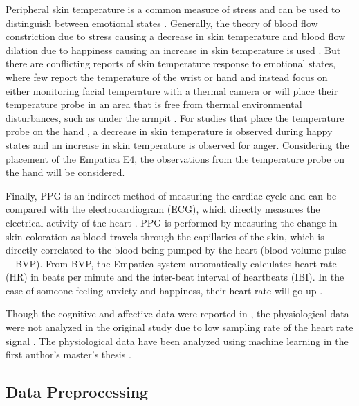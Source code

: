 \documentclass[12pt]{iopart}
\begin{document}
Peripheral skin temperature is a common measure of stress and can be used to distinguish between emotional states \cite{collet1997autonomic, salazar2015mental, karthikeyan2012descriptive}.  Generally, the theory of blood flow constriction due to stress causing a decrease in skin temperature and blood flow dilation due to happiness causing an increase in skin temperature is used \cite{karthikeyan2012descriptive}.  But there are conflicting reports of skin temperature response to emotional states, where few report the temperature of the wrist or hand and instead focus on either monitoring facial temperature with a thermal camera \cite{salazar2015mental} or will place their temperature probe in an area that is free from thermal environmental disturbances, such as under the armpit \cite{karthikeyan2012descriptive}.  For studies that place the temperature probe on the hand \cite{collet1997autonomic}, a decrease in skin temperature is observed during happy states and an increase in skin temperature is observed for anger.  Considering the placement of the Empatica E4, the observations from the temperature probe on the hand will be considered.

Finally, PPG is an indirect method of measuring the cardiac cycle and can be compared with the electrocardiogram (ECG), which directly measures the electrical activity of the heart \cite{van2019heartpy}.  PPG is performed by measuring the change in skin coloration as blood travels through the capillaries of the skin, which is directly correlated to the blood being pumped by the heart (blood volume pulse---BVP).  From BVP, the Empatica system automatically calculates heart rate (HR) in beats per minute and the inter-beat interval of heartbeats (IBI).  In the case of someone feeling anxiety and happiness, their heart rate will go up \cite{kreibig2010autonomic}.  

Though the cognitive and affective data were reported in \cite{thayer2022effects}, the physiological data were not analyzed in the original study due to low sampling rate of the heart rate signal \cite{shaffer2017overview}.  The physiological data have been analyzed using machine learning in the first author's master's thesis \cite{arce2023unobtrusive}.  

\subsection*{Data Preprocessing}
\end{document}
